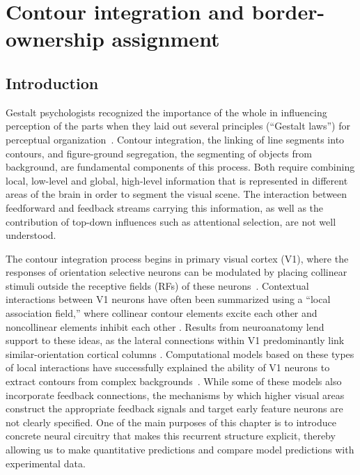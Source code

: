 \chapter{Contour integration and border-ownership assignment}
\label{sec:contour_chapter}

\section{Introduction}
\label{intro}

Gestalt psychologists recognized the importance of the whole in influencing perception of the parts when they laid out several
principles (``Gestalt laws'') for perceptual organization~\citep{Wertheimer23,Koffka35}. Contour integration, the
linking of line segments into contours, and figure-ground segregation,
the segmenting of objects from background, are fundamental components
of this process. Both require combining local, low-level and global,
high-level information that is represented in different areas of the brain in order to segment the visual scene. The interaction between feedforward and feedback streams carrying this information, as well as the contribution of top-down influences such as attentional selection, 
are not well understood.

The contour integration process begins in primary visual cortex (V1),
where the responses of orientation selective neurons can be modulated
by placing collinear stimuli outside the receptive fields (RFs) of these neurons~\citep{Stemmler_etal95a,Polat_etal98}.  Contextual
interactions between V1 neurons have often been summarized using a
``local association field,'' where collinear contour elements excite
each other and noncollinear elements inhibit each other \citep{Ullman92, Field_etal93}.  Results from neuroanatomy lend support to these ideas, as the lateral connections within V1 predominantly link similar-orientation cortical columns \citep{Gilbert_Wiesel89,Bosking_etal97,
  Stettler_etal02}. Computational models based on these types of local
interactions have successfully explained the ability of V1 neurons to
extract contours from complex backgrounds~\citep{Li98,Yen_Finkel98,Piech_etal13}. While some of
these models also incorporate feedback connections, the mechanisms by which higher visual areas construct the appropriate feedback signals and target early feature neurons are not clearly specified.  One of the main purposes of
%
this chapter
is to introduce concrete neural circuitry that makes this recurrent structure explicit, thereby allowing us to make quantitative predictions and compare model predictions with experimental data.

